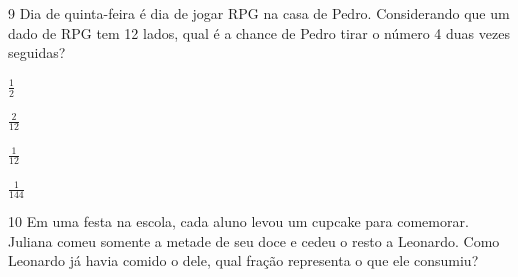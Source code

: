 
\num{9} Dia de quinta-feira é dia de jogar RPG na casa de Pedro. Considerando
que um dado de RPG tem 12 lados, qual é a chance de Pedro tirar o número
4 duas vezes seguidas?

\begin{escolha}
\item $\frac{1}{2}$
\item $\frac{2}{12}$
\item $\frac{1}{12}$
\item $\frac{1}{144}$
\end{escolha}




\num{10} Em uma festa na escola, cada aluno levou um cupcake para comemorar.
Juliana comeu somente a metade de seu doce e cedeu o resto a Leonardo.
Como Leonardo já havia comido o dele, qual fração representa o que ele
consumiu?

